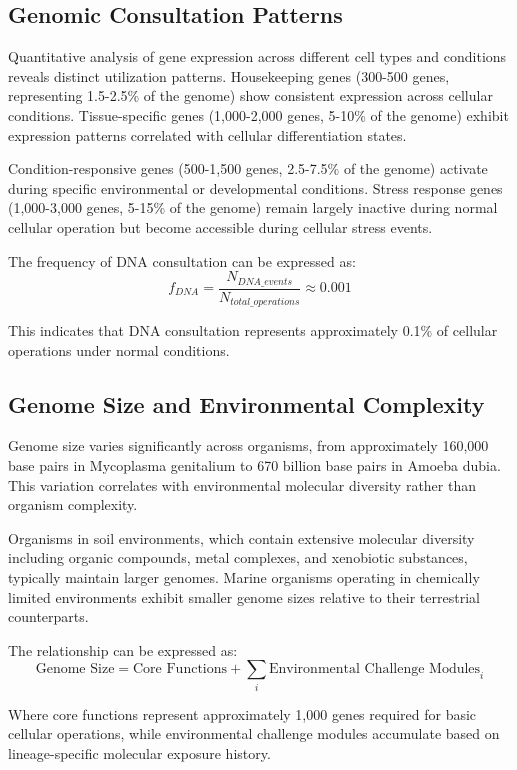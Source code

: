\subsection{Genomic Consultation Patterns}

Quantitative analysis of gene expression across different cell types and conditions reveals distinct utilization patterns. Housekeeping genes (300-500 genes, representing 1.5-2.5\% of the genome) show consistent expression across cellular conditions. Tissue-specific genes (1,000-2,000 genes, 5-10\% of the genome) exhibit expression patterns correlated with cellular differentiation states.

Condition-responsive genes (500-1,500 genes, 2.5-7.5\% of the genome) activate during specific environmental or developmental conditions. Stress response genes (1,000-3,000 genes, 5-15\% of the genome) remain largely inactive during normal cellular operation but become accessible during cellular stress events.

The frequency of DNA consultation can be expressed as:
$$f_{DNA} = \frac{N_{DNA\_events}}{N_{total\_operations}} \approx 0.001$$

This indicates that DNA consultation represents approximately 0.1\% of cellular operations under normal conditions.

\subsection{Genome Size and Environmental Complexity}

Genome size varies significantly across organisms, from approximately 160,000 base pairs in Mycoplasma genitalium to 670 billion base pairs in Amoeba dubia. This variation correlates with environmental molecular diversity rather than organism complexity.

Organisms in soil environments, which contain extensive molecular diversity including organic compounds, metal complexes, and xenobiotic substances, typically maintain larger genomes. Marine organisms operating in chemically limited environments exhibit smaller genome sizes relative to their terrestrial counterparts.

The relationship can be expressed as:
$$\text{Genome Size} = \text{Core Functions} + \sum_{i} \text{Environmental Challenge Modules}_i$$

Where core functions represent approximately 1,000 genes required for basic cellular operations, while environmental challenge modules accumulate based on lineage-specific molecular exposure history.

